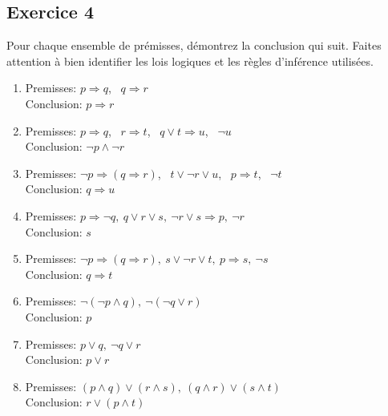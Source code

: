\subsection*{Exercice 4}
Pour chaque ensemble de prémisses, démontrez la conclusion qui suit. Faites attention à bien identifier les
lois logiques et les règles d'inférence utilisées.
\begin{enumerate}

\item Premisses: $p \Rightarrow q$, \ $q \Rightarrow r$ \\
      Conclusion: $p \Rightarrow r$
\item Premisses: $p \Rightarrow q$, \ $r \Rightarrow t$, \ $q \vee t \Rightarrow u$, \ $\neg u$ \\
      Conclusion: $\neg p \wedge \neg r$
\item Premisses: $\neg p \Rightarrow (q \Rightarrow r)$, \ $t \vee \neg r \vee u$, \ $p \Rightarrow t$, \ $\neg t$ \\
      Conclusion: $q \Rightarrow u$
			
			
\item Premisses: $p \Rightarrow \neg q, \ q \vee r \vee s, \ \neg r \vee s \Rightarrow p, \ \neg r$  \\
			Conclusion: $s$
			
			
\item Premisses: $\neg p \Rightarrow (q \Rightarrow r), \ s \vee \neg r \vee t, \ p \Rightarrow s, \ \neg s$ \\
			Conclusion: $q \Rightarrow t$
			
			
 \item Premisses: $\neg ( \neg p \wedge q), \ \neg (\neg q \vee r)$ \\
       Conclusion: $p$
 \item Premisses: $p \vee q, \ \neg q \vee r$ \\
       Conclusion: $p \vee r$
 \item Premisses: $(p \wedge q) \vee (r \wedge s), \ (q \wedge r) \vee (s \wedge t)$ \\
       Conclusion: $r \vee (p \wedge t)$

\end{enumerate}

